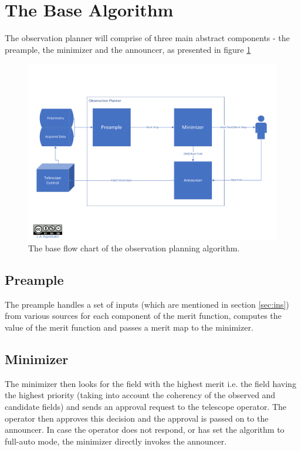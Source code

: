 \documentclass{article}
\begin{document}
\clearpage
\section{The Base Algorithm}
The observation planner will comprise of three main abstract  components - the preample, the minimizer and the announcer, as presented in figure \ref{fig:baseflow}
\begin{figure}[!ht]
\centering
\includegraphics[width=\linewidth]{Base_new.pdf}
\caption{The base flow chart of the observation planning algorithm.}
\label{fig:baseflow}
\end{figure}

\subsection{Preample}
The preample handles a set of inputs (which are mentioned in section \ref{sec:ins}) from various sources for each component of the merit function, computes the value of the merit function and passes a merit map to the minimizer.

\subsection{Minimizer}
The minimizer then looks for the field with the highest merit i.e. the field having the highest priority (taking into account the coherency of the observed and candidate fields) and sends an approval request to the telescope operator. The operator then approves this decision and the approval is passed on to the announcer. In case the operator does not respond, or has set the algorithm to full-auto mode, the minimizer directly invokes the announcer. 
\end{document}
